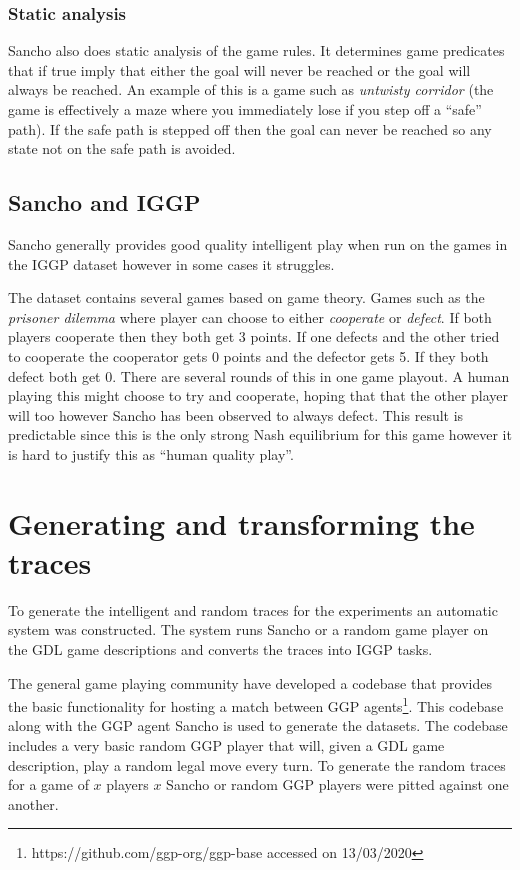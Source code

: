 \subsubsection{Static analysis}

Sancho also does static analysis of the game rules. It determines game predicates that if true imply that either the goal will never be reached or the goal will always be reached. An example of this is a game such as \textit{untwisty corridor} (the game is effectively a maze where you immediately lose if you step off a ``safe'' path). If the safe path is stepped off then the goal can never be reached so any state not on the safe path is avoided.

\subsection{Sancho and IGGP}
Sancho generally provides good quality intelligent play when run on the games in the IGGP dataset however in some cases it struggles.

The dataset contains several games based on game theory. Games such as the \textit{prisoner dilemma} where player can choose to either \textit{cooperate} or \textit{defect}. If both players cooperate then they both get 3 points. If one defects and the other tried to cooperate the cooperator gets 0 points and the defector gets 5. If they both defect both get 0. There are several rounds of this in one game playout. A human playing this might choose to try and cooperate, hoping that that the other player will too however Sancho has been observed to always defect. This result is predictable since this is the only strong Nash equilibrium for this game however it is hard to justify this as ``human quality play''.


\section{Generating and transforming the traces}\label{sec:gen}

To generate the intelligent and random traces for the experiments an automatic system was constructed. The system runs Sancho or a random game player on the GDL game descriptions and converts the traces into IGGP tasks.

The general game playing community have developed a codebase that provides the basic functionality for hosting a match between GGP agents\footnote{https://github.com/ggp-org/ggp-base accessed on 13/03/2020}. This codebase along with the GGP agent Sancho is used to generate the datasets. The codebase includes a very basic random GGP player that will, given a GDL game description, play a random legal move every turn. To generate the random traces for a game of $x$ players $x$ Sancho or random GGP players were pitted against one another.

